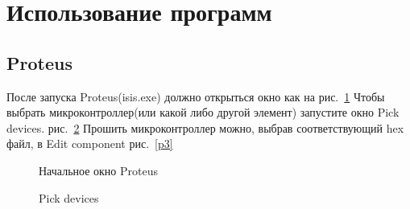 \documentclass[12pt]{article}
\begin{document}
\section{Использование программ}
\subsection{Proteus}
После запуска Proteus(isis.exe) должно открыться окно как на рис.~\ref{p1} 
Чтобы выбрать микроконтроллер(или какой либо другой элемент) запустите окно Pick devices. рис.~\ref{p2}
Прошить микроконтроллер можно, выбрав соответствующий hex файл, в Edit component рис.~\ref{p3}  
\begin{figure}[h!]
\caption{Начальное окно Proteus}
\label{p1}
\end{figure}

\begin{figure}[h!]
\caption{Pick devices}
\label{p2}
\end{figure}
\end{document}
